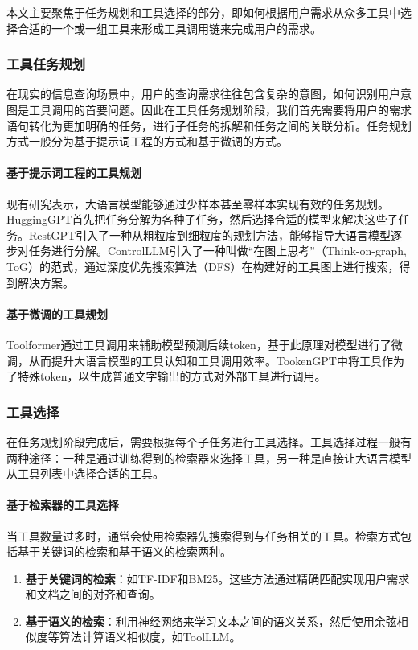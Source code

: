 本文主要聚焦于任务规划和工具选择的部分，即如何根据用户需求从众多工具中选择合适的一个或一组工具来形成工具调用链来完成用户的需求。

\subsubsection{工具任务规划}
在现实的信息查询场景中，用户的查询需求往往包含复杂的意图，如何识别用户意图是工具调用的首要问题。因此在工具任务规划阶段，我们首先需要将用户的需求语句转化为更加明确的任务，进行子任务的拆解和任务之间的关联分析。任务规划方式一般分为基于提示词工程的方式和基于微调的方式。

\paragraph{基于提示词工程的工具规划} 
现有研究\cite{Miao2023}表示，大语言模型能够通过少样本甚至零样本实现有效的任务规划。HuggingGPT\cite{Shen2023}首先把任务分解为各种子任务，然后选择合适的模型来解决这些子任务。RestGPT\cite{Song2023}引入了一种从粗粒度到细粒度的规划方法，能够指导大语言模型逐步对任务进行分解。ControlLLM\cite{Liu2023}引入了一种叫做“在图上思考”（Think-on-graph, ToG）的范式，通过深度优先搜索算法（DFS）在构建好的工具图上进行搜索，得到解决方案。

\paragraph{基于微调的工具规划} 
Toolformer\cite{Schick2023}通过工具调用来辅助模型预测后续token，基于此原理对模型进行了微调，从而提升大语言模型的工具认知和工具调用效率。TookenGPT\cite{Hao2023}中将工具作为了特殊token，以生成普通文字输出的方式对外部工具进行调用。

\subsubsection{工具选择}
在任务规划阶段完成后，需要根据每个子任务进行工具选择。工具选择过程一般有两种途径：一种是通过训练得到的检索器来选择工具，另一种是直接让大语言模型从工具列表中选择合适的工具。

\paragraph{基于检索器的工具选择} 
当工具数量过多时，通常会使用检索器先搜索得到与任务相关的工具。检索方式包括基于关键词的检索和基于语义的检索两种。

\begin{enumerate}
    \item \textbf{基于关键词的检索}：如TF-IDF\cite{sparck1972statistical}和BM25\cite{Robertson2009}。这些方法通过精确匹配实现用户需求和文档之间的对齐和查询。
    \item \textbf{基于语义的检索}：利用神经网络来学习文本之间的语义关系，然后使用余弦相似度等算法计算语义相似度，如ToolLLM\cite{Qin2023}。
\end{enumerate}


